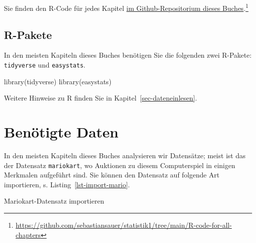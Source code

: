 \documentclass[
  letterpaper,
  twoside,
  open=any]{scrbook}
\newenvironment{Shaded}{\begin{snugshade}}{\end{snugshade}}
\newcommand{\FunctionTok}[1]{\textcolor[rgb]{0.28,0.35,0.67}{#1}}
\newcommand{\NormalTok}[1]{\textcolor[rgb]{0.00,0.23,0.31}{#1}}
\newcommand{\OtherTok}[1]{\textcolor[rgb]{0.00,0.23,0.31}{#1}}
\newcommand{\StringTok}[1]{\textcolor[rgb]{0.13,0.47,0.30}{#1}}
\theoremstyle{definition}
\theoremstyle{definition}
\theoremstyle{definition}
\theoremstyle{remark}
\begin{document}
Sie finden den R-Code für jedes Kapitel
\href{https://github.com/sebastiansauer/statistik1/tree/main/R-code-for-all-chapters}{im
Github-Repositorium dieses Buches}.\footnote{\url{https://github.com/sebastiansauer/statistik1/tree/main/R-code-for-all-chapters}}

\subsection{R-Pakete}\label{sec-rpckgs}

In den meisten Kapiteln dieses Buches benötigen Sie die folgenden zwei
R-Pakete: \texttt{tidyverse} und \texttt{easystats}.

\begin{Shaded}
\begin{Highlighting}[]
\FunctionTok{library}\NormalTok{(tidyverse)}
\FunctionTok{library}\NormalTok{(easystats)}
\end{Highlighting}
\end{Shaded}

Weitere Hinweise zu R finden Sie in Kapitel~\ref{sec-dateneinlesen}.

\section{Benötigte Daten}\label{benuxf6tigte-daten}

In den meisten Kapiteln dieses Buches analysieren wir Datensätze; meist
ist das der Datensatz \texttt{mariokart}, wo Auktionen zu diesem
Computerspiel in einigen Merkmalen aufgeführt sind. Sie können den
Datensatz auf folgende Art importieren, s.
Listing~\ref{lst-import-mario}.

\begin{codelisting}

\caption{\label{lst-import-mario}Mariokart-Datensatz importieren}

\centering{

\begin{Shaded}
\begin{Highlighting}[]
\NormalTok{mariokart }\OtherTok{\textless{}{-}} \FunctionTok{paste0}\NormalTok{(}
  \StringTok{"https://vincentarelbundock.github.io/Rdatasets/"}\NormalTok{,}
  \StringTok{"csv/openintro/mariokart.csv"}\NormalTok{)}

\NormalTok{mariokart }\OtherTok{\textless{}{-}} \FunctionTok{read.csv}\NormalTok{(mariokart\_path)}
\end{Highlighting}
\end{Shaded}

}

\end{codelisting}%
\end{document}
